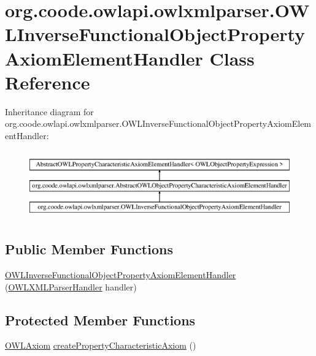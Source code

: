 \hypertarget{classorg_1_1coode_1_1owlapi_1_1owlxmlparser_1_1_o_w_l_inverse_functional_object_property_axiom_element_handler}{\section{org.\-coode.\-owlapi.\-owlxmlparser.\-O\-W\-L\-Inverse\-Functional\-Object\-Property\-Axiom\-Element\-Handler Class Reference}
\label{classorg_1_1coode_1_1owlapi_1_1owlxmlparser_1_1_o_w_l_inverse_functional_object_property_axiom_element_handler}
}
Inheritance diagram for org.\-coode.\-owlapi.\-owlxmlparser.\-O\-W\-L\-Inverse\-Functional\-Object\-Property\-Axiom\-Element\-Handler\-:\begin{figure}[H]
\begin{center}
\leavevmode
\includegraphics[height=2.984014cm]{classorg_1_1coode_1_1owlapi_1_1owlxmlparser_1_1_o_w_l_inverse_functional_object_property_axiom_element_handler}
\end{center}
\end{figure}
\subsection*{Public Member Functions}
\begin{DoxyCompactItemize}
\item 
\hyperlink{classorg_1_1coode_1_1owlapi_1_1owlxmlparser_1_1_o_w_l_inverse_functional_object_property_axiom_element_handler_a630c61608fc81aa6b0bb2c2a1fcdb6bb}{O\-W\-L\-Inverse\-Functional\-Object\-Property\-Axiom\-Element\-Handler} (\hyperlink{classorg_1_1coode_1_1owlapi_1_1owlxmlparser_1_1_o_w_l_x_m_l_parser_handler}{O\-W\-L\-X\-M\-L\-Parser\-Handler} handler)
\end{DoxyCompactItemize}
\subsection*{Protected Member Functions}
\begin{DoxyCompactItemize}
\item 
\hyperlink{interfaceorg_1_1semanticweb_1_1owlapi_1_1model_1_1_o_w_l_axiom}{O\-W\-L\-Axiom} \hyperlink{classorg_1_1coode_1_1owlapi_1_1owlxmlparser_1_1_o_w_l_inverse_functional_object_property_axiom_element_handler_a57c4a5b5f2dd393034994a9e2328699d}{create\-Property\-Characteristic\-Axiom} ()
\end{DoxyCompactItemize}


